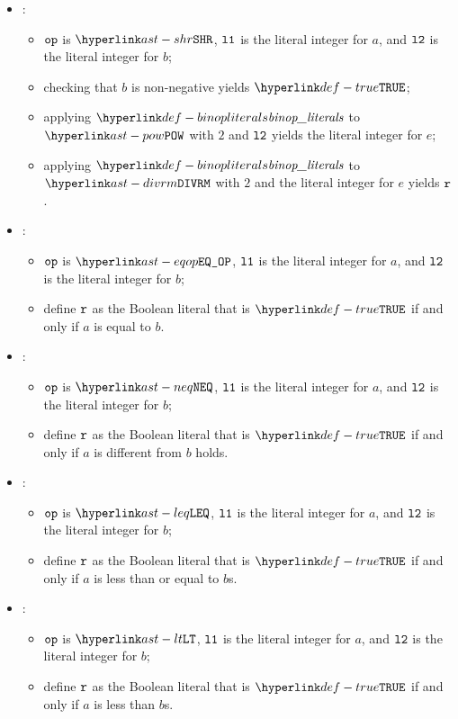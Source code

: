 \begin{itemize}
  \item {}:
  \begin{itemize}
    \item $\texttt{op}$ is $\SHR$, $\texttt{l1}$ is the literal integer for $a$, and $\texttt{l2}$ is the literal integer for $b$;
    \item checking that $b$ is non-negative yields $\True$\ProseOrTypeError;
    \item applying $\binopliterals$ to $\POW$ with $2$ and $\texttt{l2}$ yields the literal integer for $e$;
    \item applying $\binopliterals$ to $\DIVRM$ with $2$ and the literal integer for $e$ yields $\texttt{r}$.
  \end{itemize}

  \item {}:
  \begin{itemize}
    \item $\texttt{op}$ is $\EQOP$, $\texttt{l1}$ is the literal integer for $a$, and $\texttt{l2}$ is the literal integer for $b$;
    \item define $\texttt{r}$ as the Boolean literal that is $\True$ if and only if $a$ is equal to $b$.
  \end{itemize}

  \item {}:
  \begin{itemize}
    \item $\texttt{op}$ is $\NEQ$, $\texttt{l1}$ is the literal integer for $a$, and $\texttt{l2}$ is the literal integer for $b$;
    \item define $\texttt{r}$ as the Boolean literal that is $\True$ if and only if $a$ is different from $b$ holds.
  \end{itemize}

  \item {}:
  \begin{itemize}
    \item $\texttt{op}$ is $\LEQ$, $\texttt{l1}$ is the literal integer for $a$, and $\texttt{l2}$ is the literal integer for $b$;
    \item define $\texttt{r}$ as the Boolean literal that is $\True$ if and only if $a$ is less than or equal to $b$s.
  \end{itemize}

  \item {}:
  \begin{itemize}
    \item $\texttt{op}$ is $\LT$, $\texttt{l1}$ is the literal integer for $a$, and $\texttt{l2}$ is the literal integer for $b$;
    \item define $\texttt{r}$ as the Boolean literal that is $\True$ if and only if $a$ is less than $b$s.
  \end{itemize}


\end{itemize}
